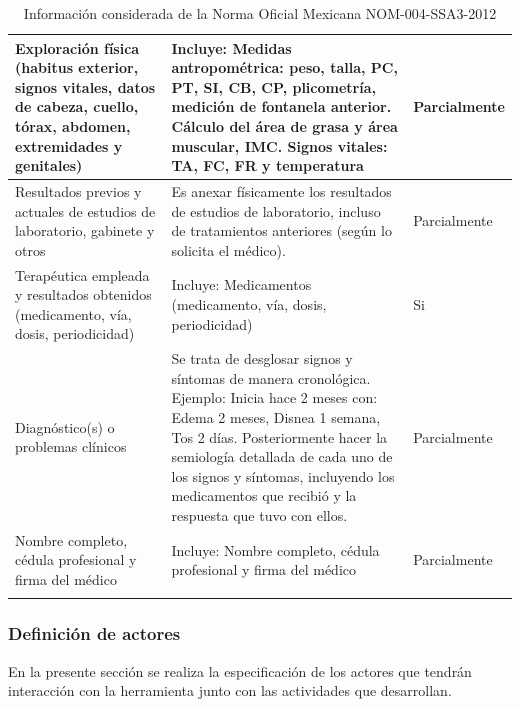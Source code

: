 \begin{longtable}{|p{4cm}|p{10cm}|p{3cm}|}
 Exploración física (habitus exterior, signos vitales, datos de cabeza, cuello, tórax, abdomen, extremidades y genitales)
& Incluye: Medidas antropométrica: peso, talla, PC, PT, SI, CB, CP, plicometría,  medición de fontanela anterior. Cálculo del área de grasa y área muscular, IMC. Signos vitales: TA, FC, FR y temperatura & Parcialmente\\ \hline

Resultados previos y actuales de estudios de laboratorio, gabinete y otros
& Es anexar físicamente los resultados de estudios de laboratorio, incluso de tratamientos anteriores (según lo solicita el médico).
& Parcialmente\\ \hline

Terapéutica empleada y resultados obtenidos (medicamento, vía, dosis, periodicidad)
& Incluye: Medicamentos (medicamento, vía, dosis, periodicidad)
& Si\\ \hline

Diagnóstico(s) o problemas clínicos
& Se trata de desglosar signos y síntomas de manera cronológica. Ejemplo: Inicia hace 2 meses con: Edema 2 meses, Disnea 1 semana, Tos 2 días. Posteriormente hacer la semiología detallada de cada uno de los signos y síntomas, incluyendo los medicamentos que recibió y la respuesta que tuvo con ellos.
& Parcialmente\\ \hline

Nombre completo, cédula profesional y firma del médico
& Incluye: Nombre completo, cédula profesional y firma del médico
& Parcialmente\\ \hline

\caption{Información considerada de la Norma Oficial Mexicana NOM-004-SSA3-2012}
\label{table:1}
\end{longtable}



\subsubsection{Definición de actores}

En la presente sección se realiza la especificación de los actores que tendrán interacción con la herramienta junto con las actividades que desarrollan.

